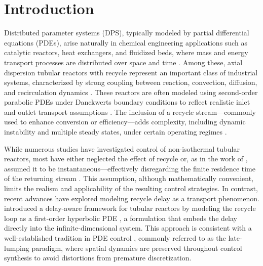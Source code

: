 \section{Introduction}

Distributed parameter systems (DPS), typically modeled by partial differential equations (PDEs), arise naturally in chemical engineering applications such as catalytic reactors, heat exchangers, and fluidized beds, where mass and energy transport processes are distributed over space and time \autocite{ray1981advanced, davison1976robust,Curtain2020Introduction}. Among these, axial dispersion tubular reactors with recycle represent an important class of industrial systems, characterized by strong coupling between reaction, convection, diffusion, and recirculation dynamics \autocite{jensen1982bifurcation, Ali2015Review, Hlavacˇek1970Modeling,Hlavacˇek1970Modelinga,Cohen1974Tubular,Georgakis1977Studies}. These reactors are often modeled using second-order parabolic PDEs under Danckwerts boundary conditions to reflect realistic inlet and outlet transport assumptions \autocite{Danckwerts1953Continuous}. The inclusion of a recycle stream—commonly used to enhance conversion or efficiency—adds complexity, including dynamic instability and multiple steady states, under certain operating regimes \autocite{Luss1967Stability,Bildea2004Design}. 

While numerous studies have investigated control of non-isothermal tubular reactors, most have either neglected the effect of recycle or, as in the work of , assumed it to be instantaneous—effectively disregarding the finite residence time of the returning stream \autocite{Khatibi2021Model}. This assumption, although mathematically convenient, limits the realism and applicability of the resulting control strategies. In contrast, recent advances have explored modeling recycle delay as a transport phenomenon.  introduced a delay-aware framework for tubular reactors by modeling the recycle loop as a first-order hyperbolic PDE \autocite{moadeli2025optimal}, a formulation that embeds the delay directly into the infinite-dimensional system. This approach is consistent with a well-established tradition in PDE control \autocite{Christofides1997Finite,Armaou2002Dynamic, aksikas2017optimal,balas1979feedback,Curtain1982Finite}, commonly referred to as the late-lumping paradigm, where spatial dynamics are preserved throughout control synthesis to avoid distortions from premature discretization.

